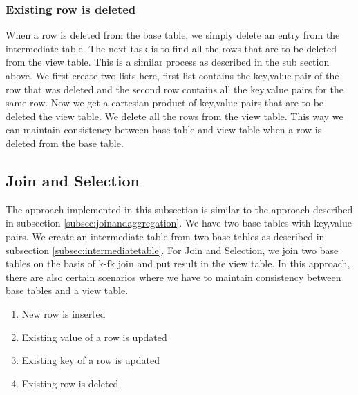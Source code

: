 \documentclass[11pt,a4paper,bibtotoc,idxtotoc,headsepline,footsepline,footexclude,BCOR12mm,DIV13]{scrbook}
\begin{document}
\subsubsection{Existing row is deleted}

When a row is deleted from the base table, we simply delete an entry from the intermediate table. The next task is to find all the rows that are to be deleted from the view table. This is a similar process as described in the sub section above. We first create two lists here, first list contains the key,value pair of the row that was deleted and the second row contains all the key,value pairs for the same row. Now we get a cartesian product of key,value pairs that are to be deleted the view table. We delete all the rows from the view table. This way we can maintain consistency between base table and view table when a row is deleted from the base table.

\subsection{Join and Selection}
\label{subsec:joinandselection}

The approach implemented in this subsection is similar to the approach described in subsection \ref{subsec:joinandaggregation}. We have two base tables with key,value pairs. We create an intermediate table from two base tables as described in subsection \ref{subsec:intermediatetable}. For Join and Selection, we join two base tables on the basis of k-fk join and put result in the view table. In this approach, there are also certain scenarios where we have to maintain consistency between base tables and a view table.

\begin{enumerate}
	\item New row is inserted
	\item Existing value of a row is updated
	\item Existing key of a row is updated
	\item Existing row is deleted
\end{enumerate}
\end{document}
